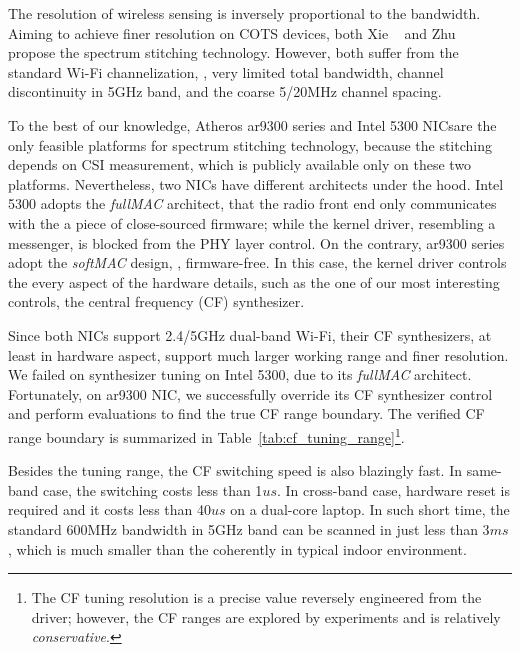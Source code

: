


The resolution of wireless sensing is inversely proportional to the bandwidth. 
Aiming to achieve finer resolution on COTS devices, 
both Xie \etal~\cite{Xie2015Precise} and Zhu \etal~\cite{Zhu:2018fc} 
propose the spectrum stitching technology.
However, both suffer from the standard Wi-Fi channelization, \ie,
very limited total bandwidth,
channel discontinuity in 5GHz band,
and the coarse 5/20MHz channel spacing.

To the best of our knowledge,
Atheros ar9300 series and Intel 5300 NICsare 
the only feasible platforms for spectrum stitching technology,
because the stitching depends on CSI measurement, 
which is publicly available only on these two platforms\cite{csitool, Xie2015Precise}.
Nevertheless, two NICs have different architects under the hood.
%
Intel 5300 adopts the \textit{fullMAC} architect, 
that the radio front end only communicates with the a piece of close-sourced firmware;
while the kernel driver, resembling a messenger, is blocked from the PHY layer control.
%
On the contrary, ar9300 series adopt the \textit{softMAC} design, \ie, firmware-free.
In this case, the kernel driver controls the every aspect of the hardware details, 
such as the one of our most interesting controls, the central frequency (CF) synthesizer.

Since both NICs support 2.4/5GHz dual-band Wi-Fi, 
their CF synthesizers, at least in hardware aspect, support much larger working range and finer resolution.
We failed on synthesizer tuning on Intel 5300, due to its \textit{fullMAC} architect.
Fortunately, on ar9300 NIC, we successfully override its CF synthesizer control and perform evaluations to find the true CF range boundary. The verified CF range boundary is summarized in Table~\ref{tab:cf_tuning_range}\footnote{The CF tuning resolution is a precise value reversely engineered from the driver; however, the CF ranges are explored by experiments and is relatively \textit{conservative}.}. 

Besides the tuning range, 
the CF switching speed is also blazingly fast. 
In same-band case, the switching costs less than 1$us$. 
In cross-band case, hardware reset is required 
and it costs less than 40$us$ on a dual-core laptop.
In such short time, the standard 600MHz bandwidth in 5GHz band can be scanned in just less than 3$ms$, which is much smaller than the coherently in typical indoor environment.




